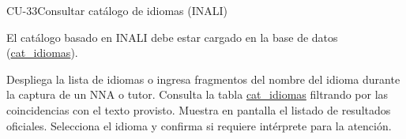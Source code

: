 \begin{UseCase}{CU-33}{Consultar catálogo de idiomas (INALI)}
{\begin{Titemize}
			\Titem El catálogo basado en INALI debe estar cargado en la base de datos (\hyperlink{CatIdiomas}{cat\_idiomas}).
		\end{Titemize}
	}
\end{UseCase}

\begin{UCtrayectoria}
	\UCpaso[\UCactor] Despliega la lista de idiomas o ingresa fragmentos del nombre del idioma durante la captura de un NNA o tutor.
	\UCpaso Consulta la tabla \hyperlink{CatIdiomas}{cat\_idiomas} filtrando por las coincidencias con el texto provisto.
	\UCpaso Muestra en pantalla el listado de resultados oficiales. 
	\UCpaso[\UCactor] Selecciona el idioma y confirma si requiere intérprete para la atención.
\end{UCtrayectoria}

